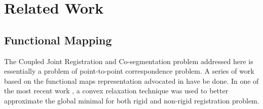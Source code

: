 \section{Related Work}
\label{sec:rw}
\subsection{Functional Mapping}
The Coupled Joint Registration and Co-segmentation problem addressed here is essentially a problem of point-to-point correspondence problem. A series of work based on the functional maps representation advocated in \cite{Ovsjanikov:2012:FMF:2185520.2185526} have be done. In one of the most recent work \cite{Maron:2016:ConvRelax}, a convex relaxation technique was used to better approximate the global minimal for both rigid and non-rigid registration problem.   